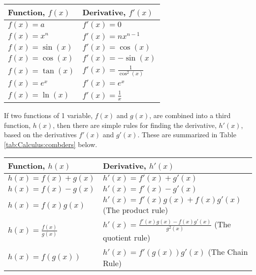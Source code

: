 \begin{center}
\begin{tabular}{l l}
\textbf{Function, $f(x)$} & \textbf{Derivative, $f'(x)$}\\
\hline\hline
$f(x)=a$ & $f'(x)=0$ \\
$f(x)=x^n$ & $f'(x)=nx^{n-1}$ \\
$f(x)=\sin(x)$ & $f'(x)=\cos(x)$ \\
$f(x)=\cos(x)$ & $f'(x)=-\sin(x)$ \\
$f(x)=\tan(x)$ & $f'(x)=\frac{1}{\cos^2(x)}$ \\
$f(x)=e^x$ & $f'(x)=e^x$ \\
$f(x)=\ln(x)$ & $f'(x)=\frac{1}{x}$ \\
\hline
\end{tabular}
\end{center}
If two functions of 1 variable, $f(x)$ and $g(x)$, are combined into a third function, $h(x)$, then there are simple rules for finding the derivative, $h'(x)$, based on the derivatives $f'(x)$ and $g'(x)$. These are summarized in Table \ref{tab:Calculus:combders} below.
\begin{center}
\begin{tabular}{l l}
\textbf{Function, $h(x)$} & \textbf{Derivative, $h'(x)$}\\
\hline\hline
$h(x)=f(x)+g(x)$ & $h'(x)=f'(x)+g'(x)$ \\
$h(x)=f(x)-g(x)$ & $h'(x)=f'(x)-g'(x)$ \\
$h(x)=f(x)g(x)$ & $h'(x)=f'(x)g(x)+f(x)g'(x)$ (The product rule) \\
$h(x)=\frac{f(x)}{g(x)}$ & $h'(x)=\frac{f'(x)g(x)-f(x)g'(x)}{g^2(x)}$ (The quotient rule)\\
$h(x)=f(g(x))$ & $h'(x)=f'(g(x))g'(x)$ (The Chain Rule) \\
\hline
\end{tabular}
\end{center}
